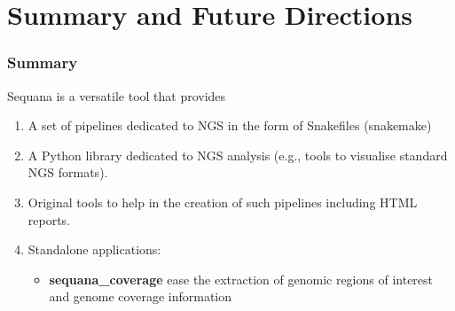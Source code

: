 \documentclass{beamer}
\begin{document}
\section{Summary and Future Directions}

\begin{frame}
 \frametitle{Summary}
Sequana is a versatile tool that provides

\begin{enumerate}
 \item A set of pipelines dedicated to NGS in the form of Snakefiles (snakemake)
 \item A Python library dedicated to NGS analysis (e.g., tools to visualise standard NGS formats).
 \item Original tools to help in the creation of such pipelines including HTML reports.
 \item Standalone applications:
 \begin{itemize}
    \item \textbf{sequana\_coverage} ease the extraction of genomic regions of interest and genome coverage information
 \end{itemize}
\end{enumerate}
\end{frame}
\end{document}
